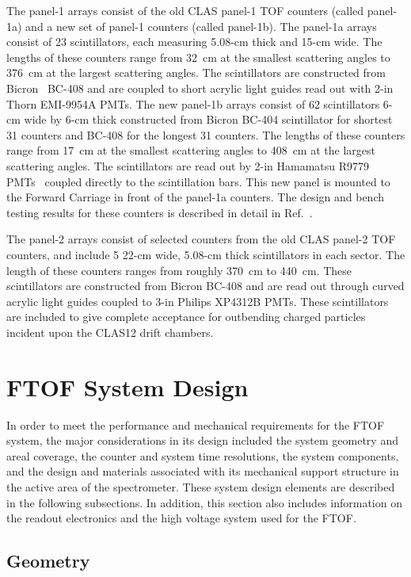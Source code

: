 \documentclass{elsart}
\begin{document}
The panel-1 arrays consist of the old CLAS panel-1 TOF counters (called panel-1a) and a new set of panel-1
counters (called panel-1b).  The panel-1a arrays consist of 23 scintillators, each measuring 5.08-cm thick
and 15-cm wide.  The lengths of these counters range from 32~cm at the smallest scattering angles to
376~cm at the largest scattering angles.  The scintillators are constructed from Bicron~\cite{bicron}
BC-408 and are coupled to short acrylic light guides read out with 2-in Thorn EMI-9954A PMTs.  The new
panel-1b arrays consist of 62 scintillators 6-cm wide by 6-cm thick constructed from Bicron BC-404 scintillator
for shortest 31 counters and BC-408 for the longest 31 counters. The lengths of these counters range from
17~cm at the smallest scattering angles to 408~cm at the largest scattering angles. The scintillators are read
out by 2-in Hamamatsu R9779 PMTs~\cite{hamamatsu} coupled directly to the scintillation bars. This new panel
is mounted to the Forward Carriage in front of the panel-1a counters. The design and bench testing results for
these counters is described in detail in Ref.~\cite{nim-p1b}.

The panel-2 arrays consist of selected counters from the old CLAS panel-2 TOF counters, and include 5
22-cm wide, 5.08-cm thick scintillators in each sector.  The length of these counters ranges from roughly
370~cm to 440~cm.  These scintillators are constructed from Bicron BC-408 and are read out through
curved acrylic light guides coupled to 3-in Philips XP4312B PMTs. These scintillators are included to give
complete acceptance for outbending charged particles incident upon the CLAS12 drift chambers.  

\section{FTOF System Design}
\label{sec:design}

In order to meet the performance and mechanical requirements for the FTOF system, the major
considerations in its design included the system geometry and areal coverage, the counter and system
time resolutions, the system components, and the design and materials associated with its mechanical
support structure in the active area of the spectrometer. These system design elements are described
in the following subsections. In addition, this section also includes information on the readout electronics
and the high voltage system used for the FTOF.

\subsection{Geometry}
\label{ftof-geometry}
\end{document}
